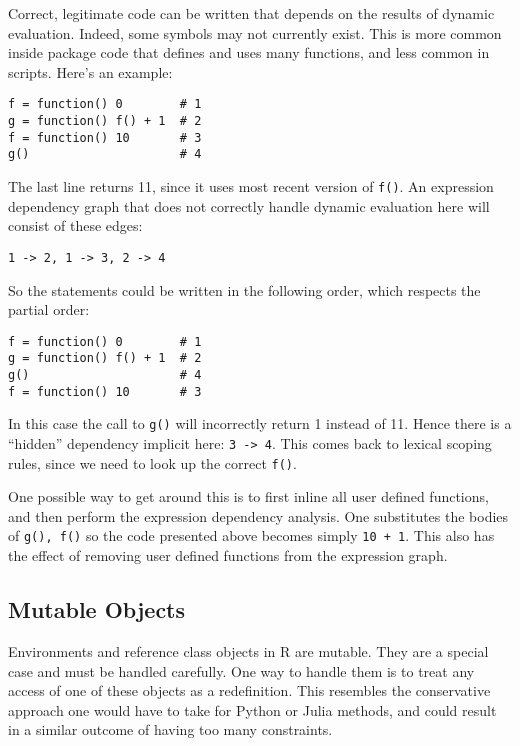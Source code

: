\documentclass[12pt]{article}
\begin{document}
Correct, legitimate code can be written that depends on the results of
dynamic evaluation. Indeed, some symbols may not currently exist. This is
more common inside package code that defines and uses many functions, and
less common in scripts.  Here's an example:

\begin{verbatim}
f = function() 0        # 1
g = function() f() + 1  # 2
f = function() 10       # 3
g()                     # 4
\end{verbatim}

The last line returns 11, since it uses most recent version of \texttt{f()}.
An expression dependency graph that does not correctly handle dynamic
evaluation here will consist of these edges:

\begin{verbatim}
1 -> 2, 1 -> 3, 2 -> 4
\end{verbatim}

So the statements could be written in the following order, which respects
the partial order:

\begin{verbatim}
f = function() 0        # 1
g = function() f() + 1  # 2
g()                     # 4
f = function() 10       # 3
\end{verbatim}

In this case the call to \texttt{g()} will incorrectly return 1 instead of 11.
Hence there is a ``hidden'' dependency implicit here: \texttt{3 -> 4}.
This comes back to lexical scoping rules, since we need to look up the
correct \texttt{f()}.

One possible way to get around this is to first inline all user defined
functions, and then perform the expression dependency analysis. One
substitutes the bodies of \texttt{g(), f()} so the code presented above
becomes simply \texttt{10 + 1}. This also has the effect of removing user
defined functions from the expression graph.

\subsection{Mutable Objects}

Environments and reference class objects in R are mutable. They are a
special case and must be handled carefully. One way to handle them is to
treat any access of one of these objects as a redefinition. This resembles
the conservative approach one would have to take for Python or Julia
methods, and could result in a similar outcome of having too many
constraints.
\end{document}
